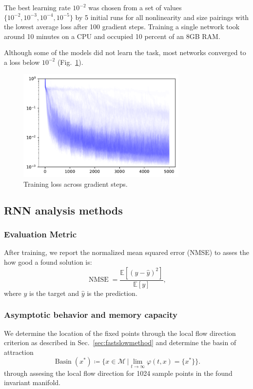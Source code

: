\documentclass{article} %
\newcounter{ct}
\newcommand{\manifold}{\mathcal{M}}
\DeclareMathOperator{\basin}{Basin}
\theoremstyle{definition}
\theoremstyle{remark}
\begin{document}
The best learning rate \(10^{-2}\) was chosen from a set of values \(\{10^{-2},10^{-3},10^{-4},10^{-5}\}\) by 5 initial runs for all nonlinearity and size pairings with the lowest average loss after 100 gradient steps.
Training a single network took around 10 minutes on a CPU and occupied 10 percent of an 8GB RAM.


Although some of the models did not learn the task, most networks converged to a loss below \(10^{-2}\) (Fig.~\ref{fig:training_losses}).
 \begin{figure}[tbhp]
     \centering
    \includegraphics[width=0.75\textwidth]{training_losses}
       \caption{Training loss across gradient steps.}\label{fig:training_losses}
\end{figure}






\newpage
 \subsection{RNN analysis methods}


\subsubsection{Evaluation Metric}
After training, we report the normalized mean squared error (NMSE) to asses the how good a found solution is:
\begin{equation}
\operatorname{NMSE} = \frac{\mathbb{E}[(y-\hat y)^{2}]}{\mathbb{E}[y]},
\end{equation}where \(y\) is the target and \(\hat y\) is the prediction.


\subsubsection{Asymptotic behavior and memory capacity}\label{sec:supp:asymbehav}
We determine the location of the fixed points through the local flow direction criterion as described in Sec.~\ref{sec:fastslowmethod}
and determine the basin of attraction
\begin{equation}
\basin(x^*) \coloneqq \{x\in \manifold \ | \lim_{t\rightarrow\infty}\varphi(t, x)=\{x^*\}\}.
\end{equation}through assesing the local flow direction for 1024 sample points in the found invariant manifold.
\end{document}
